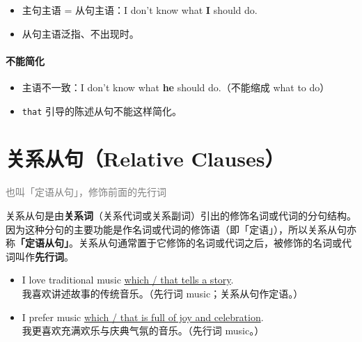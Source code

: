 \documentclass[11pt,a4paper]{ctexart}
\begin{document}
\begin{itemize}[leftmargin=1.4em]
\item 主句主语 = 从句主语：I don’t know what \textbf{I} should do.
\item 从句主语泛指、不出现时。
\end{itemize}

\paragraph{不能简化}

\begin{itemize}[leftmargin=1.4em]
\item 主语不一致：I don’t know what \textbf{he} should do.（不能缩成 what to do）
\item \texttt{that} 引导的陈述从句不能这样简化。
\end{itemize}

\begin{center}\end{center}

\begin{center}\end{center}

\section{关系从句（Relative Clauses）}
\noindent\textcolor{gray}{也叫「定语从句」，修饰前面的先行词}\par\smallskip
关系从句是由\textbf{关系词}（关系代词或关系副词）引出的修饰名词或代词的分句结构。因为这种分句的主要功能是作名词或代词的修饰语（即「定语」），所以关系从句亦称\textbf{「定语从句」}。关系从句通常置于它修饰的名词或代词之后，被修饰的名词或代词叫作\textbf{先行词}。

\begin{itemize}[leftmargin=1.4em]
\item I love traditional music \underline{which / that tells a story}.\\ 我喜欢讲述故事的传统音乐。（先行词 music；关系从句作定语。）
\item I prefer music \underline{which / that is full of joy and celebration}.\\ 我更喜欢充满欢乐与庆典气氛的音乐。（先行词 music。）
\end{itemize}
\end{document}
